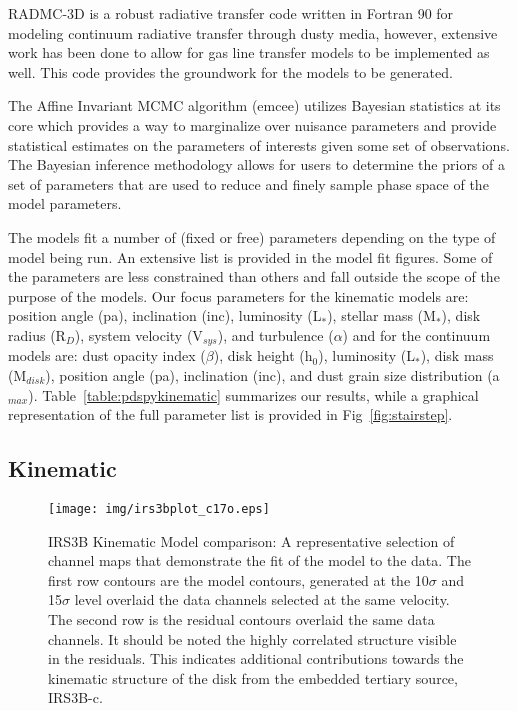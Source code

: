\documentclass[preprint,12pt]{aastex62}
\begin{document}
RADMC-3D \citep{2012ascl.soft02015D} is a robust radiative transfer code written in Fortran 90 for modeling continuum radiative transfer through dusty media, however, extensive work has been done to allow for gas line transfer models to be implemented as well. This code provides the groundwork for the models to be generated.

The Affine Invariant MCMC algorithm (emcee) utilizes Bayesian statistics at its core which provides a way to marginalize over nuisance parameters and provide statistical estimates on the parameters of interests given some set of observations. The Bayesian inference methodology allows for users to determine the priors of a set of parameters that are used to reduce and finely sample phase space of the model parameters. 

The models fit a number of (fixed or free) parameters depending on the type of model being run. An extensive list is provided in the model fit figures. Some of the parameters are less constrained than others and fall outside the scope of the purpose of the models. Our focus parameters for the kinematic models are: position angle (pa), inclination (inc), luminosity (L$_*$), stellar mass (M$_*$), disk radius (R$_D$), system velocity (V$_{sys}$), and turbulence ($\alpha$) and for the continuum models are: dust opacity index ($\beta$), disk height (h$_0$), luminosity (L$_{*}$), disk mass (M$_{disk}$), position angle (pa), inclination (inc), and dust grain size distribution (a$_{max}$). Table~\ref{table:pdspykinematic} summarizes our results, while a graphical representation of the full parameter list is provided in Fig~\ref{fig:stairstep}. 

\subsection{Kinematic}

\begin{figure}[H]
\begin{center}
\texttt{[image: img/irs3bplot\_c17o.eps]}
\end{center}
\caption{IRS3B Kinematic Model comparison: A representative selection of channel maps that demonstrate the fit of the model to the data. The first row contours are the model contours, generated at the 10$\sigma$ and 15$\sigma$ level overlaid the data channels selected at the same velocity. The second row is the residual contours overlaid the same data channels. It should be noted the highly correlated structure visible in the residuals. This indicates additional contributions towards the kinematic structure of the disk from the embedded tertiary source, IRS3B-c.}\label{fig:c17o_res}
\end{figure}
\end{document}
